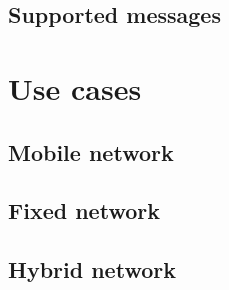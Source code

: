 		\subsection{Supported messages}
				
			
	\section{Use cases}
		
		
		\subsection{Mobile network}
		
		\subsection{Fixed network}
		
		\subsection{Hybrid network}